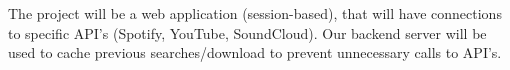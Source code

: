 The project will be a web application (session-based), that will have connections to specific API’s (Spotify, YouTube, SoundCloud). Our backend server will be used to cache previous searches/download to prevent unnecessary calls to API’s.
